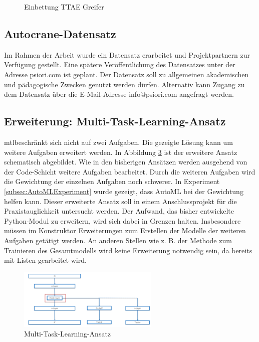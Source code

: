 \begin{figure}[h]
\begin{subfigure}[c]{0.6\textwidth}
 			\label{img:TTGrappleEinbettungVorhersage}	
 		\end{subfigure}
 		\caption{Einbettung TTAE Greifer}
 		\label{img:TTGrappleEmb}
 	\end{figure}
 	
	\subsection{Autocrane-Datensatz}
	\label{subsec:AutocraneDatensatz}	
	Im Rahmen der Arbeit wurde ein Datensatz erarbeitet und Projektpartnern zur Verfügung gestellt. Eine spätere Veröffentlichung des Datensatzes unter der Adresse psiori.com ist geplant. Der Datensatz soll zu allgemeinen akademischen und pädagogische Zwecken genutzt werden dürfen. Alternativ kann Zugang zu dem Datensatz über die E-Mail-Adresse info@psiori.com angefragt werden.

	\subsection{Erweiterung: Multi-Task-Learning-Ansatz}
	\label{subsec:MehrfacheAufgaben}
	\acl{mtl}beschränkt sich nicht auf zwei Aufgaben. Die gezeigte Lösung kann um weitere Aufgaben erweitert werden. In Abbildung \ref{img:AusblickMultiTaskAnsatz} ist der erweitere Ansatz schematisch abgebildet. Wie in den bisherigen Ansätzen werden ausgehend von der Code-Schicht weitere Aufgaben bearbeitet. Durch die weiteren Aufgaben wird die Gewichtung der einzelnen Aufgaben noch schwerer. In Experiment \ref{subsec:AutoMLExperiment}  wurde gezeigt, dass AutoML bei der Gewichtung helfen kann. Dieser erweiterte Ansatz soll in einem Anschlussprojekt für die Praxistauglichkeit untersucht werden. Der Aufwand, das bisher entwickelte Python-Modul zu erweitern, wird sich dabei in Grenzen halten. Insbesondere müssen im Konstruktor Erweiterungen zum Erstellen der Modelle der weiteren Aufgaben getätigt werden. An anderen Stellen wie z. B. der Methode zum Trainieren des Gesamtmodells wird keine Erweiterung notwendig sein, da bereits mit Listen gearbeitet wird.
	\begin{figure}[h]
		\centering
		\includegraphics[width=0.6\textwidth, center]{bilder/FazitUndAusblick/MultiTaskAnsatz.PNG}
		\caption{Multi-Task-Learning-Ansatz}
		\label{img:AusblickMultiTaskAnsatz}
	\end{figure}

